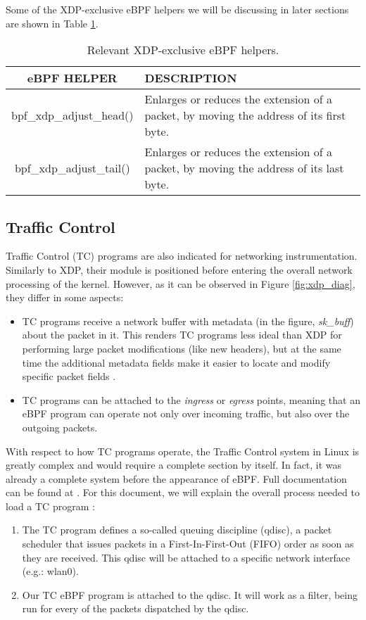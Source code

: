 Some of the XDP-exclusive eBPF helpers we will be discussing in later sections are shown in Table \ref{table:xdp_helpers}.
\begin{table}[htbp]
\begin{tabular}{|c|>{\centering\arraybackslash}p{8cm}|}
\hline
\textbf{eBPF HELPER} & \textbf{DESCRIPTION}\\
\hline
\hline
bpf\_xdp\_adjust\_head() & Enlarges or reduces the extension of a packet, by moving the address of its first byte.\\
\hline
bpf\_xdp\_adjust\_tail() & Enlarges or reduces the extension of a packet, by moving the address of its last byte.\\
\hline
\end{tabular}
\caption{Relevant XDP-exclusive eBPF helpers.}
\label{table:xdp_helpers}
\end{table}


\subsection{Traffic Control} \label{subsection:tc}
Traffic Control (TC) programs are also indicated for networking instrumentation. Similarly to XDP, their module is positioned before entering the overall network processing of the kernel. However, as it can be observed in Figure \ref{fig:xdp_diag}, they differ in some aspects:
\begin{itemize}
\item TC programs receive a network buffer with metadata (in the figure, \textit{sk\_buff}) about the packet in it. This renders TC programs less ideal than XDP for performing large packet modifications (like new headers), but at the same time the additional metadata fields make it easier to locate and modify specific packet fields \cite{tc_differences}.
\item TC programs can be attached to the \textit{ingress} or \textit{egress} points, meaning that an eBPF program can operate not only over incoming traffic, but also over the outgoing packets.
\end{itemize}

With respect to how TC programs operate, the Traffic Control system in Linux is greatly complex and would require a complete section by itself. In fact, it was already a complete system before the appearance of eBPF. Full documentation can be found at \cite{tc_docs_complete}. For this document, we will explain the overall process needed to load a TC program \cite{tc_direct_action}:
\begin{enumerate}
\item The TC program defines a so-called queuing discipline (qdisc), a packet scheduler that issues packets in a First-In-First-Out (FIFO) order as soon as they are received. This qdisc will be attached to a specific network interface (e.g.: wlan0).
\item Our TC eBPF program is attached to the qdisc. It will work as a filter, being run for every of the packets dispatched by the qdisc.
\end{enumerate}

